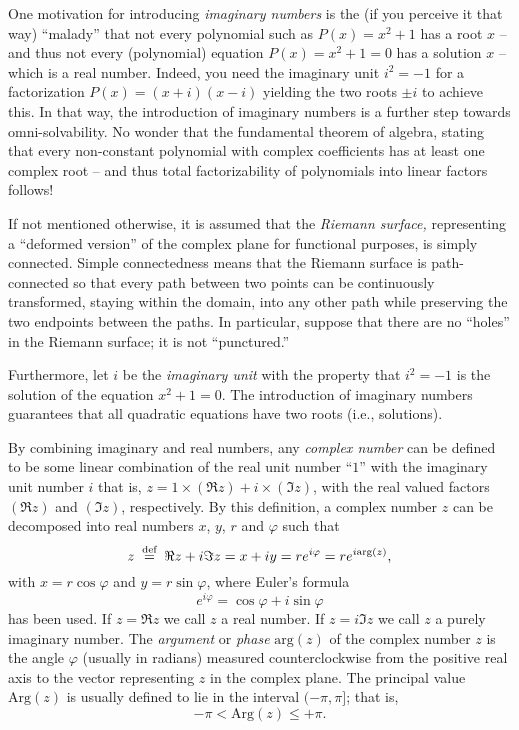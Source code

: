 One motivation for introducing
{\em imaginary numbers}
is the (if you perceive it that way)
``malady''
that not every polynomial such as $P(x)=x^2+1$ has a root $x$
-- and thus not every (polynomial) equation $P(x)=x^2+1=0$ has a
solution $x$  --
which is a real number.
Indeed, you need the imaginary unit $i^2 =-1$ for a factorization $P(x)=(x+i)(x-i)$ yielding the two roots $\pm i$
to achieve this.
In that way, the introduction of imaginary numbers is a further step towards omni-solvability.
No wonder that the fundamental theorem of algebra, stating that every
non-constant polynomial with complex coefficients has at least one complex root
--
and thus total factorizability of polynomials into linear factors follows!

If not mentioned otherwise, it is assumed that the
{\em Riemann surface,}
representing a ``deformed version'' of the complex plane for functional purposes,
is simply connected.
Simple connectedness means that the Riemann surface
is path-connected so that every path between two points can be continuously transformed, staying within the domain,
into any other path while preserving the two endpoints between the paths.
In particular, suppose that
there are no ``holes'' in the Riemann surface; it is not ``punctured.''

Furthermore, let $i$ be the
{\em imaginary unit}
 with the property that
 $i^2=-1$ is the solution of the equation $x^2+1=0$.
The introduction of imaginary numbers  guarantees that all quadratic
equations have two roots (i.e., solutions).


By combining imaginary and real numbers,
any {\em complex number} can be defined to be some linear combination of the real unit number ``$1$''
with the imaginary unit number $i$
that is,
$
z= 1 \times (\Re z)  +  i \times (\Im z)
$,
with the real valued factors $(\Re z) $
and $(\Im z)$, respectively.
By this definition,
a complex number $z$ can be decomposed into real numbers $x$, $y$, $r$ and $\varphi$ such that
\begin{equation}
z \stackrel{{\tiny \textrm{ def }}}{=}  \Re z + i \Im  z  =x +iy  =r e^{i\varphi}= r e^{i \textrm{arg}(z)},
\label{2017-m-ca-cn}
\end{equation}
with $x = r\cos \varphi$
and $y = r\sin \varphi$,
where {Euler's formula}
\begin{equation}
e^{i\varphi} = \cos \varphi +i \sin \varphi
\label{2012-m-ch-ca-ef}
\end{equation}
has been used.
If  $z = \Re z $ we call $z$ a real number.
If  $z = i\Im z $ we call $z$ a purely imaginary number.
The {\em argument}
or {\em phase}
$\textrm{arg}(z)$ of the complex number $z$ is the angle $\varphi$ (usually in radians)
measured counterclockwise from the positive real axis to the vector representing $z$ in the complex plane.
The principal value $\textrm{Arg} (z)$ is usually defined to lie in   the interval $( - \pi, \pi ]$; that is,
\begin{equation}
-\pi < \textrm{Arg} (z) \le +\pi
.
\label{2018-m-ch-ca-ef}
\end{equation}

